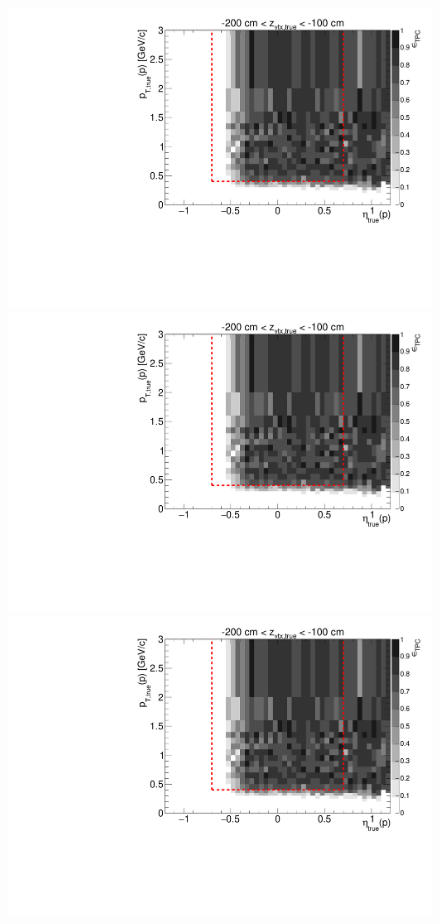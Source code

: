 \begin{figure}[hb]
{  \includegraphics[width=\linewidth,page=6]{graphics/eff/Eff2D_TPC_proton_Plus.pdf}\\
  \includegraphics[width=\linewidth,page=8]{graphics/eff/Eff2D_TPC_proton_Plus.pdf}\\
  \includegraphics[width=\linewidth,page=10]{graphics/eff/Eff2D_TPC_proton_Plus.pdf}
}%
\end{figure}
